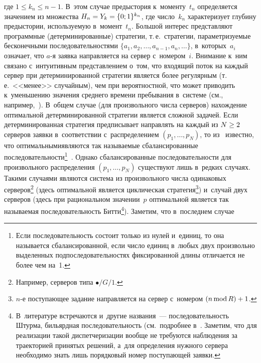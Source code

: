 \begin{multicols}{2}
\begin{enumerate}[1.]
$$    $$
где $1\leq k_n\leq n-1$. В~этом случае предыс\-то\-рия к~моменту~$t_n$ определяется 
значением из множества $H_n\hm= Y_k\hm= \{0;1\}^{k_n}$, где чис\-ло~$k_n$ 
характеризует глубину предыстории, используемую в~момент~$t_n$. Большой интерес\linebreak 
представляют программные (детерминированные) стратегии, т.\,е.\ стратегии, 
параметризуемые бесконечными последовательностями $\{ a_1, a_2, \ldots, a_{n-1}, 
a_n,\ldots\}$, в~которых~$a_i$ означает, что  
\mbox{$a$-я} заявка направляется на сервер с~номером~$i$. Внимание к~ним связано 
с~интуитивным представлением о~том, что входящий поток на каждый сервер при 
детерминированной стратегии является более регулярным (т.\,е.\ <<менее>> случайным), 
чем при вероятностной, что может приводить к~уменьшению значения среднего времени 
пребывания в~системе (см.,\linebreak
 например,~\cite{14-kon, 13-kon}). В~общем случае (для 
произвольного числа серверов) нахождение оп\-тимальной детерминированной стратегии\linebreak 
является сложной задачей. Если детерминированная стратегия предписывает на\-прав\-лять 
на каждый из $N\hm\geq 2$ серверов заявки в~соот\-вет\-ст\-вии с~распределением $(p_1, \ldots, 
p_N)$, то из~\cite{15-kon} известно, что оптимальными\linebreak являются так называемые 
сбалансированные последовательности\footnote{Если последовательность состоит только 
из нулей и~единиц, то она называется сбалансированной, если число единиц в~любых двух 
произвольно выделенных подпоследовательностях фиксированной длины отличается не 
более чем на~1.}~\cite{6-kon}. Однако сбалансированные последовательности для 
произвольного распределения $(p_1, \ldots, p_N)$ существуют лишь в~редких случаях. 
Такими случаями являются система из произвольного чис\-ла одинаковых 
серверов\footnote{Например, серверов типа $\bullet/G/1$.} (здесь оптимальной является 
цик\-ли\-че\-ская стратегия\footnote{$n$-е поступающее задание направляется на сервер 
с~номером $(n\,\mathrm{mod}\,R)\hm+1$.}) и~случай двух серверов (здесь при 
рациональном значении~$p$ оптимальной является так на\-зы\-ва\-емая последовательность 
Битти\footnote{В~литературе встречаются и~другие названия~--- последовательность 
Штурма, бильярдная последовательность (см.\ подробнее в~\cite{24-kon, 16-kon}. Заметим, 
что для реализации такой диспетчеризации вообще не требуются наблюдения за 
траекторией принятых решений, а~для определения нужного сервера необходимо знать 
лишь порядковый номер поступающей заявки.}). Заметим, что в~последнем случае 

\end{enumerate}
\end{multicols}
